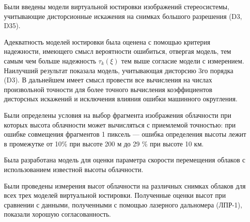Были введены модели виртуальной юстировки изображений стереосистемы, учитывающие
дисторсионные искажения на снимках большого разрешения (D3, D35).

Адекватность моделей юстировки была оценена с помощью критерия надежности, имеющего
смысл вероятности ошибиться, отвергая модель, тем самым чем больше
надежность $\tau_k(\xi)$ тем выше согласие модели с измерением.
Наилучший результат показала модель, учитывающая дисторсию 3го порядка (D3).
В дальнейшем имеет смысл провести все вычисления на числах произвольной точности для более точного
вычисления коэффициентов дисторсных искажений и исключения влияния ошибки машинного округления.

Были определены условия на выбор фрагмента изображения облачности при которых
высота облачности может вычисляться с приемлемой точностью: при ошибке совмещения фрагментов
1 пиксель --- ошибка определения высоты лежит в промежутке от 10\% при высоте 200 м
до 29 \% при высоте 10 км.

Была разработана модель для оценки параметра скорости перемещения облаков с использованием
известной высоты облачности.

Были проведены измерения высот облачности на различных снимках облаков для всех трех
моделей виртуальной юстировки. Полученные оценки высот при сравнении с данными, полученными
с помощью лазерного дальномера (ЛПР-1), показали хорошую согласованность.